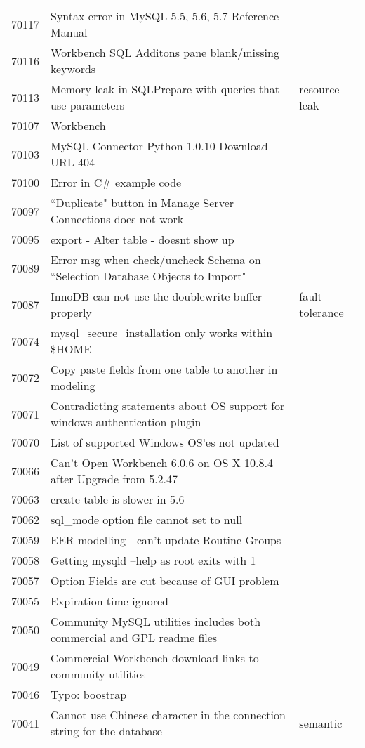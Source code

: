 \begin{longtable}[c]{p{1cm}p{10cm}p{1cm}}
70117 & Syntax error in MySQL 5.5, 5.6, 5.7 Reference Manual &  \\
70116 & Workbench SQL Additons pane blank/missing keywords &  \\
70113 & Memory leak in SQLPrepare with queries that use parameters & resource-leak \\
70107 & Workbench &  \\
70103 & MySQL Connector Python 1.0.10 Download URL 404 &  \\
70100 & Error in C\# example code &  \\
70097 & ``Duplicate" button in Manage Server Connections does not work &  \\
70095 & export - Alter table - doesnt show up &  \\
70089 & Error msg when check/uncheck Schema on ``Selection Database Objects to Import" &  \\
70087 & InnoDB can not use the doublewrite buffer properly & fault-tolerance \\
70074 & mysql\_secure\_installation only works within \$HOME &  \\
70072 & Copy paste fields from one table to another in modeling &  \\
70071 & Contradicting statements about OS support for windows authentication plugin &  \\
70070 & List of supported Windows OS'es not updated &  \\
70066 & Can't Open Workbench 6.0.6 on OS X 10.8.4 after Upgrade from 5.2.47 &  \\
70063 & create table is slower in 5.6 &  \\
70062 & sql\_mode option file cannot set to null &  \\
70059 & EER modelling - can't update Routine Groups &  \\
70058 & Getting mysqld --help as root exits with 1 &  \\
70057 & Option Fields are cut because of GUI problem &  \\
70055 & Expiration time ignored &  \\
70050 & Community MySQL utilities includes both commercial and GPL readme files &  \\
70049 & Commercial Workbench download links to community utilities &  \\
70046 & Typo: boostrap &  \\
70041 & Cannot use Chinese character in the connection string for the database & semantic \\

\end{longtable}
